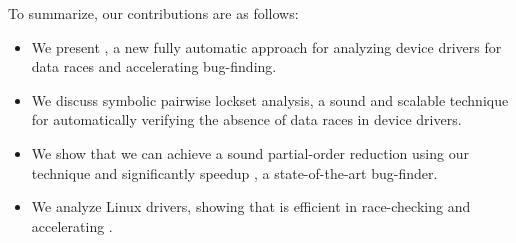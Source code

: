 To summarize, our contributions are as follows:
\begin{itemize}
\item We present \whoop, a new fully automatic approach for analyzing device drivers for data races and accelerating bug-finding.
\item We discuss symbolic pairwise lockset analysis,  a sound and scalable technique for automatically verifying the absence of data races in device drivers.
\item We show that we can achieve a sound partial-order reduction using our technique and significantly speedup \corral, a state-of-the-art bug-finder.
\item We analyze \sizeOfBenchmarks Linux drivers, showing that \whoop is efficient in race-checking and accelerating \corral.
\end{itemize}
